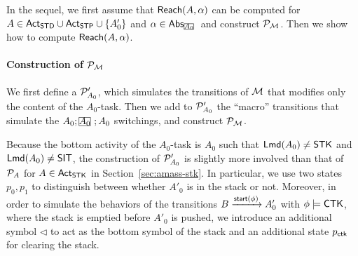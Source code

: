 In the sequel, we first assume that ${\sf Reach}(A, \alpha)$ can be computed for $A \in {\sf Act}_{\sf STD} \cup {\sf Act}_{\sf STP} \cup \{A'_0\}$ and $\alpha \in \abs_{\mhcancel{A_0}}$ and construct ${\mathcal{P} }_{\mathcal{M} }$. Then we show how to compute ${\sf Reach}(A, \alpha)$. 

\paragraph*{Construction of ${\mathcal{P} }_{\mathcal{M} }$} 
We first define a {\WOTrPDS} ${\mathcal{P} }'_{A_0}$, which simulates the transitions of ${\mathcal{M} }$ that modifies only the content of the $A_0$-task. Then we add to ${\mathcal{P} }'_{A_0}$ the ``macro'' transitions that simulate the $A_0;\mhcancel{A_0};A_0$ switchings, and construct ${\mathcal{P} }_{\mathcal{M} }$.  

Because the bottom activity of the $A_0$-task is $A_0$ such that ${\sf Lmd}(A_0) \neq \mathsf{STK}$ and ${\sf Lmd}(A_0) \neq \mathsf{SIT}$, the construction of ${\mathcal{P} }'_{A_0}$ is slightly more involved than that of ${\mathcal{P} }_A$ for $A \in {\sf Act}_{\sf STK}$ in Section~\ref{sec:amass-stk}. In particular, we use two states $p_0, p_1$ to distinguish between whether $A'_0$ is in the stack or not. Moreover, in order to simulate the behaviors of the transitions $B \xrightarrow{{\mathsf{start} }(\phi)} A'_0$ with $\phi \models \mathsf{CTK}$, where the stack is emptied before $A'_0$ is pushed, we introduce an additional symbol $\triangleleft$ to act as the bottom symbol of the stack and an additional state $p_{\sf ctk}$ for clearing the stack. 

